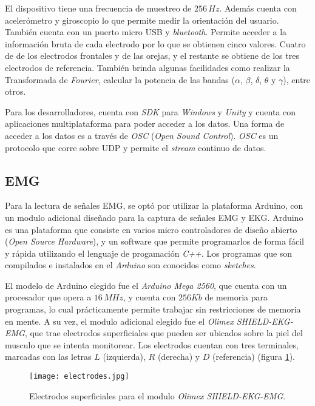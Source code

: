 El dispositivo tiene una frecuencia de muestreo de $ 256 \, Hz$. Además cuenta con acelerómetro y giroscopio lo que permite medir la orientación del usuario. También cuenta con un puerto micro USB y \emph{bluetooth}. Permite acceder a la información bruta de cada electrodo por lo que se obtienen cinco valores. Cuatro de de los electrodos frontales y de las orejas, y el restante se obtiene de los tres electrodos de referencia. También brinda algunas facilidades como realizar la Transformada de \emph{Fourier},  calcular la potencia de las bandas ($\alpha$, $\beta$, $\delta$, $\theta$ y $\gamma$), entre otros.

Para los desarrolladores, cuenta con \emph{SDK} para \emph{Windows} y \emph{Unity} y cuenta con aplicaciones multiplataforma para poder acceder a los datos. Una forma de acceder a los datos es a través de \emph{OSC} (\emph{Open Sound Control}). \emph{OSC} es un protocolo que corre sobre UDP y permite el \emph{stream} continuo de datos.

\subsection{EMG} \label{emg-hardware}

Para la lectura de señales EMG, se optó por utilizar la plataforma Arduino, con un modulo adicional diseñado para la captura de señales EMG y EKG.  Arduino es una plataforma que consiste en varios micro controladores de diseño abierto (\emph{Open Source Hardware}), y un software que permite programarlos de forma fácil y rápida utilizando el lenguaje de progamación \emph{C++}. Los programas que son compilados e instalados en el \emph{Arduino} son conocidos como \emph{sketches}.

El modelo de Arduino elegido fue el \emph{Arduino Mega 2560}, que cuenta con un procesador que opera a $16\, MHz$, y cuenta con $256 Kb$ de memoria para programas, lo cual prácticamente permite trabajar sin restricciones de memoria en mente. A su vez, el modulo adicional elegido fue el \emph{Olimex SHIELD-EKG-EMG}, que trae electrodos superficiales que pueden ser ubicados sobre la piel del musculo que se intenta monitorear.  Los electrodos cuentan con tres terminales, marcadas con las letras $L$ (izquierda), $R$ (derecha) y $D$ (referencia) (figura \ref{fig:emg-electrodes}).

\begin{figure}[H]
	\centering
    \texttt{[image: electrodes.jpg]}
    \caption{Electrodos superficiales para el modulo \emph{Olimex SHIELD-EKG-EMG}.}
	\label{fig:emg-electrodes}
\end{figure}


